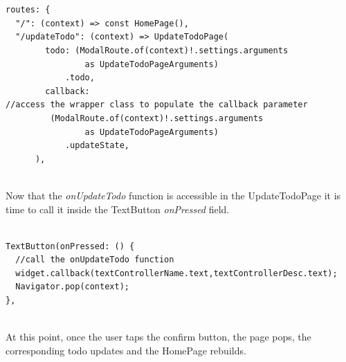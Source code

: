 \mbox{}\\
\begin{code}

\mbox{}
\label{code:2.42}
\begin{verbatim}

routes: {
  "/": (context) => const HomePage(),
  "/updateTodo": (context) => UpdateTodoPage(
        todo: (ModalRoute.of(context)!.settings.arguments
                as UpdateTodoPageArguments)
            .todo,
        callback:
//access the wrapper class to populate the callback parameter        
         (ModalRoute.of(context)!.settings.arguments
                as UpdateTodoPageArguments)
            .updateState,
      ),
\end{verbatim}
\end{code}
\mbox{}\\
Now that the \textit{onUpdateTodo }function is accessible in the UpdateTodoPage it is time to call it inside the TextButton \textit{onPressed  }field.
\mbox{}\\
\begin{code}

\mbox{}
\label{code:2.43}
\begin{verbatim}

TextButton(onPressed: () {
  //call the onUpdateTodo function
  widget.callback(textControllerName.text,textControllerDesc.text);
  Navigator.pop(context);
},
\end{verbatim}
\end{code}
\mbox{}\\
At this point, once the user taps the confirm button, the page pops, the corresponding todo updates and the HomePage rebuilds.\\



